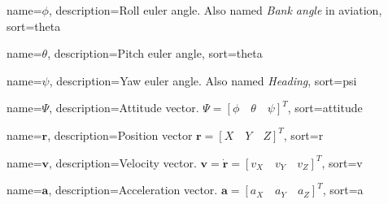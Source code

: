 {
	name={$\phi$},
  	description={Roll euler angle. Also named \textit{Bank angle} in aviation},
  	sort=theta
}

{
	name={$\theta$},
  	description={Pitch euler angle},
  	sort=theta
}

{
	name={$\psi$},
  	description={Yaw euler angle. Also named \textit{Heading}},
  	sort=psi
}

{
	name={$\Psi$},
	description={Attitude vector. $\Psi = [\phi \quad \theta \quad \psi]^T$},
	sort=attitude
}

{
	name={$\textbf{r}$},
  	description={Position vector $\textbf{r} = [X \quad Y \quad Z]^{T}$},
  	sort=r
}

{
	name={$\textbf{v}$},
	description={Velocity vector. $\textbf{v} = \dot{\textbf{r}} = [v_X \quad v_Y \quad v_Z]^T$},
	sort=v
}

{
	name={$\textbf{a}$},
	description={Acceleration vector. $\textbf{a} = [a_X \quad a_Y \quad a_Z]^T$},
	sort=a
}


